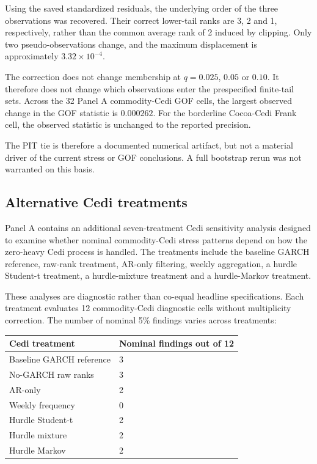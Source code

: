 Using the saved standardized residuals, the underlying order of the three observations was recovered. Their correct lower-tail ranks are 3, 2 and 1, respectively, rather than the common average rank of 2 induced by clipping. Only two pseudo-observations change, and the maximum displacement is approximately \(3.32\times10^{-4}\).

The correction does not change membership at \(q=0.025\), \(0.05\) or \(0.10\). It therefore does not change which observations enter the prespecified finite-tail sets. Across the 32 Panel A commodity-Cedi GOF cells, the largest observed change in the GOF statistic is \(0.000262\). For the borderline Cocoa-Cedi Frank cell, the observed statistic is unchanged to the reported precision.

The PIT tie is therefore a documented numerical artifact, but not a material driver of the current stress or GOF conclusions. A full bootstrap rerun was not warranted on this basis.

\subsection{Alternative Cedi treatments}

Panel A contains an additional seven-treatment Cedi sensitivity analysis designed to examine whether nominal commodity-Cedi stress patterns depend on how the zero-heavy Cedi process is handled. The treatments include the baseline GARCH reference, raw-rank treatment, AR-only filtering, weekly aggregation, a hurdle Student-t treatment, a hurdle-mixture treatment and a hurdle-Markov treatment.

These analyses are diagnostic rather than co-equal headline specifications. Each treatment evaluates 12 commodity-Cedi diagnostic cells without multiplicity correction. The number of nominal 5\% findings varies across treatments:

\begin{table}[htbp]
\centering
\small
\begin{tabularx}{\textwidth}{lX}
\toprule
\textbf{Cedi treatment} & \textbf{Nominal findings out of 12} \\
\midrule
Baseline GARCH reference & 3 \\
No-GARCH raw ranks & 3 \\
AR-only & 2 \\
Weekly frequency & 0 \\
Hurdle Student-t & 2 \\
Hurdle mixture & 2 \\
Hurdle Markov & 2 \\
\bottomrule
\end{tabularx}
\end{table}

